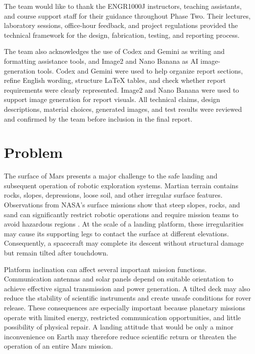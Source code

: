\documentclass{engr1000j-s2}
\begin{document}
  
The team would like to thank the ENGR1000J instructors, teaching assistants, and course support staff for their guidance throughout Phase Two. Their lectures, laboratory sessions, office-hour feedback, and project regulations provided the technical framework for the design, fabrication, testing, and reporting process.

The team also acknowledges the use of Codex and Gemini as writing and formatting assistance tools, and Image2 and Nano Banana as AI image-generation tools. Codex and Gemini were used to help organize report sections, refine English wording, structure LaTeX tables, and check whether report requirements were clearly represented. Image2 and Nano Banana were used to support image generation for report visuals. All technical claims, design descriptions, material choices, generated images, and test results were reviewed and confirmed by the team before inclusion in the final report.

  \newpage
  \tableofcontents
  \thispagestyle{mystyle}
  \newpage

\section{Problem}
\label{sec:problem}

The surface of Mars presents a major challenge to the safe landing and subsequent operation of robotic exploration systems. Martian terrain contains rocks, slopes, depressions, loose soil, and other irregular surface features. Observations from NASA's surface missions show that steep slopes, rocks, and sand can significantly restrict robotic operations and require mission teams to avoid hazardous regions \cite{nasa_curiosity_climb}. At the scale of a landing platform, these irregularities may cause its supporting legs to contact the surface at different elevations. Consequently, a spacecraft may complete its descent without structural damage but remain tilted after touchdown.

Platform inclination can affect several important mission functions. Communication antennas and solar panels depend on suitable orientation to achieve effective signal transmission and power generation. A tilted deck may also reduce the stability of scientific instruments and create unsafe conditions for rover release. These consequences are especially important because planetary missions operate with limited energy, restricted communication opportunities, and little possibility of physical repair. A landing attitude that would be only a minor inconvenience on Earth may therefore reduce scientific return or threaten the operation of an entire Mars mission.
\end{document}
